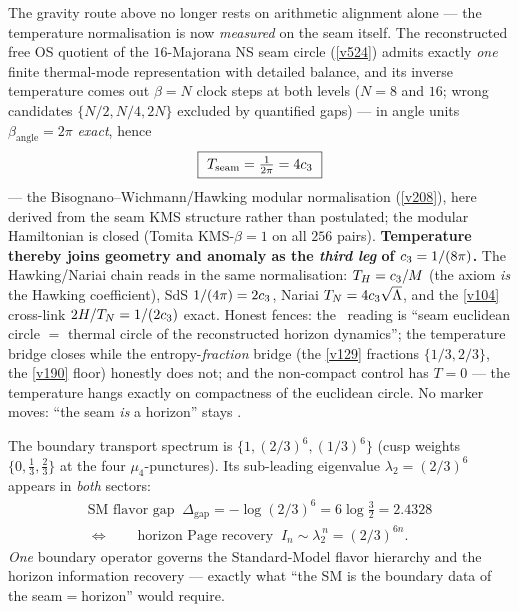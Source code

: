 \begin{keybox}
The gravity route above no longer rests on arithmetic alignment alone --- the temperature
normalisation is now \emph{measured} on the seam itself. The reconstructed free OS quotient of
the $16$-Majorana NS seam circle (\vref{v524}) admits exactly \emph{one} finite thermal-mode
representation with detailed balance, and its inverse temperature comes out $\beta=N$ clock
steps at both levels ($N=8$ and $16$; wrong candidates $\{N/2,N/4,2N\}$ excluded by quantified
gaps) --- in angle units $\beta_{\mathrm{angle}}=2\pi$ \emph{exact}, hence
\[
  \boxed{\ T_{\mathrm{seam}}=\tfrac1{2\pi}=4\cthree\ }
\]
--- the Bisognano--Wichmann/Hawking modular normalisation (\vref{v208}), here derived from the
seam KMS structure rather than postulated; the modular Hamiltonian is closed (Tomita
KMS-$\beta=1$ on all $256$ pairs). \textbf{Temperature thereby joins geometry and anomaly as the
\emph{third leg} of $c_3=1/(8\pi)$.} The Hawking/Nariai chain reads in the same
normalisation: $T_H=c_3/M$ (the axiom \emph{is} the Hawking coefficient), SdS
$1/(4\pi)=2c_3$, Nariai $T_N=4c_3\sqrt\Lambda$, and the \vref{v104} cross-link
$2H/T_N=1/(2c_3)$ exact. Honest fences: the \mC\ reading is ``seam euclidean circle $=$
thermal circle of the reconstructed horizon dynamics''; the temperature bridge closes while the
entropy-\emph{fraction} bridge (the \vref{v129} fractions $\{1/3,2/3\}$, the \vref{v190} floor)
honestly does not; and the non-compact control has $T=0$ --- the temperature hangs exactly on
compactness of the euclidean circle. No marker moves: ``the seam \emph{is} a horizon'' stays \mC.
\end{keybox}

\begin{keybox}
The boundary transport spectrum is $\{1,(2/3)^6,(1/3)^6\}$ (cusp weights $\{0,\tfrac13,\tfrac23\}$ at the
four $\mu_4$-punctures). Its sub-leading eigenvalue $\lambda_2=(2/3)^6$ appears in \emph{both} sectors:
\[
  \begin{gathered}
  \text{SM flavor gap }\ \Delta_{\mathrm{gap}}=-\log(2/3)^6=6\log\tfrac32=2.4328\\[2pt]
  \Longleftrightarrow\qquad
  \text{horizon Page recovery }\ I_n\sim\lambda_2^{\,n}=(2/3)^{6n}.
  \end{gathered}
\]
\emph{One} boundary operator governs the Standard-Model flavor hierarchy and the horizon information
recovery --- exactly what ``the SM is the boundary data of the seam$=$horizon'' would require.
\end{keybox}

